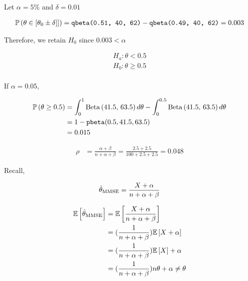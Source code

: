 \documentclass[12pt]{article}
\begin{document}
\begin{enumerate}
Let $\alpha = 5\%$ and $\delta = 0.01$

\begin{align*}
    \mathbb{P}\left(\theta \in [\theta_0 \pm \delta]]\right) = \texttt{qbeta(0.51, 40, 62)} - \texttt{qbeta(0.49, 40, 62)} = 0.003
\end{align*}

Therefore, we retain $H_0$ since $0.003 < \alpha$


\begin{align*}
   H_a : \theta < 0.5 \\
   H_0 : \theta \geq 0.5 \\ 
\end{align*}

If $\alpha = 0.05$,

\begin{align*}
    \mathbb{P}\left(\theta \geq 0.5\right) &= \int_0^1 \mathrm{Beta}\left(41.5,\,63.5\right)d\theta - \int_0^{0.5} \mathrm{Beta}\left(41.5,\,63.5\right)d\theta \\
    &= 1 - \texttt{pbeta}(0.5, 41.5, 63.5) \\ 
    &= 0.015
\end{align*}


\begin{align*}
    \rho &= \frac{\alpha+\beta}{n+\alpha+\beta} = \frac{2.5 + 2.5}{100 + 2.5 + 2.5} = 0.048
\end{align*}


Recall,

\begin{align*}
    \hat{\theta}_{\mathrm{MMSE}} = \frac{X + \alpha}{n + \alpha + \beta} 
\end{align*}

\begin{align*}
    \mathbb{E}\left[\hat{\theta}_{\mathrm{MMSE}}\right] &= \mathbb{E}\left[\frac{X + \alpha}{n + \alpha + \beta}\right] \\
        &= (\frac{1}{n+\alpha+\beta})\mathbb{E}\left[X + \alpha\right] \\
        &= (\frac{1}{n+\alpha+\beta})\mathbb{E}\left[X\right] + \alpha \\
        &= (\frac{1}{n+\alpha+\beta})n\theta + \alpha \neq \theta
\end{align*} 


\end{enumerate}
\end{document}
